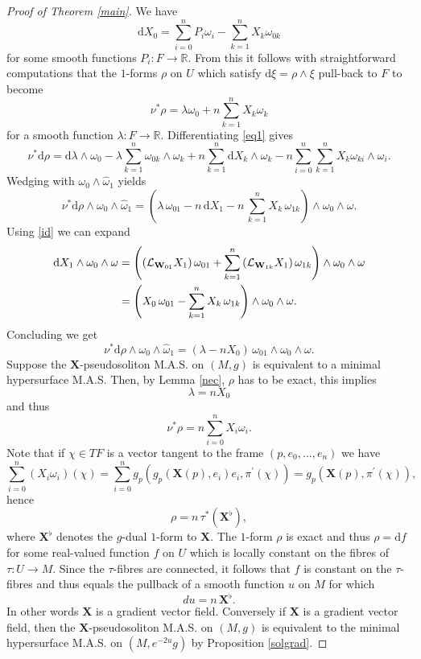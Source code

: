\documentclass[11pt,letterpaper]{amsart}
\theoremstyle{definition}
\numberwithin{equation}{section}
\begin{document}
\begin{proof}[Proof of Theorem \ref{main}]
We have 
$$
{\mathrm{d}} X_0=\sum_{i=0}^n P_i \omega_i-\sum_{k=1}^n X_k\omega_{0k}
$$
for some smooth functions $P_i : F \to {\mathbb{R}}$. From this it follows with straightforward computations that the $1$-forms $\rho$ on $U$ which satisfy ${\mathrm{d}}\xi=\rho \wedge \xi$ pull-back to $F$ to become
\begin{equation}\label{eq1}
\nu^*\rho=\lambda \omega_0+n\sum_{k=1}^n X_k \omega_k
\end{equation}
for a smooth function $\lambda : F \to {\mathbb{R}}$. Differentiating \eqref{eq1} gives
$$
\nu^*{\mathrm{d}}\rho={\mathrm{d}}\lambda\wedge\omega_0-\lambda\sum_{k=1}^n\omega_{0k}\wedge\omega_k+n\sum_{k=1}^n{\mathrm{d}} X_k\wedge\omega_k-n\sum_{i=0}^n\sum_{k=1}^nX_k\omega_{ki}\wedge\omega_i.
$$
Wedging with $\omega_0\wedge\hat{\omega}_1$ yields
$$
\nu^*{\mathrm{d}}\rho\wedge\omega_0\wedge\hat{\omega}_1=\left(\lambda\, \omega_{01}-n\,{\mathrm{d}} X_1-n\,\sum_{k=1}^n X_k\,\omega_{1k}\right)\wedge\omega_0\wedge\omega.
$$
Using \eqref{id} we can expand
$$
\aligned
{\mathrm{d}} X_1\wedge\omega_0\wedge\omega&=\left(\left(\mathcal{L}_{{\mathbf{W}}_{01}}X_1\right)\omega_{01}+\sum_{k=1}^n\left(\mathcal{L}_{{\mathbf{W}}_{1k}}X_1\right)\omega_{1k}\right)\wedge\omega_0\wedge\omega\\
&=\left(X_0\,\omega_{01}-\sum_{k=1}^nX_k\,\omega_{1k}\right)\wedge\omega_0\wedge\omega.\\
\endaligned
$$
Concluding we get
$$
\nu^*{\mathrm{d}}\rho\wedge\omega_0\wedge\hat{\omega}_1=(\lambda-nX_0)\,\omega_{01}\wedge\omega_0\wedge\omega.
$$
Suppose the ${\mathbf{X}}$-pseudosoliton M.A.S. on $(M,g)$ is equivalent to a minimal hypersurface M.A.S. Then, by Lemma \ref{nec}, $\rho$ has to be exact, this implies
$$
\lambda=nX_0
$$
and thus
$$
\nu^*\rho=n\sum_{i=0}^n X_i \omega_i. 
$$
Note that if $\chi \in TF$ is a vector tangent to the frame $(p,e_0,\ldots,e_n)$ we have 
$$
\sum_{i=0}^n\left(X_i\omega_i\right)(\chi)=\sum_{i=0}^ng_p\left(g_p({\mathbf{X}}(p),e_i)e_i,\pi^{\prime}(\chi)\right)=g_p\left({\mathbf{X}}(p),\pi^{\prime}(\chi)\right),
$$
hence
$$
\rho=n\,\tau^*\left({\mathbf{X}}^{\flat}\right),
$$
where ${\mathbf{X}}^{\flat}$ denotes the $g$-dual $1$-form to ${\mathbf{X}}$. The $1$-form $\rho$ is exact and thus $\rho={\mathrm{d}} f$ for some real-valued function $f$ on $U$ which is locally constant on the fibres of $\tau : U \to M$. Since the $\tau$-fibres are connected, it follows that $f$ is constant on the $\tau$-fibres and thus equals the pullback of a smooth function $u$ on $M$ for which
$$
du=n\,{\mathbf{X}}^{\flat}.
$$ 
In other words ${\mathbf{X}}$ is a gradient vector field. Conversely if ${\mathbf{X}}$ is a gradient vector field, then the ${\mathbf{X}}$-pseudosoliton M.A.S. on $(M,g)$ is equivalent to the minimal hypersurface M.A.S. on $(M,e^{-2u}g)$ by Proposition \ref{solgrad}. 
\end{proof}
\end{document}
